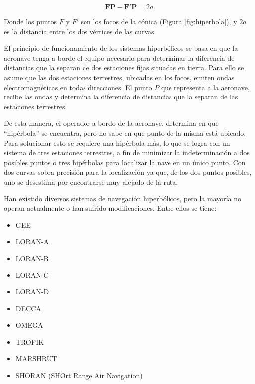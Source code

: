 \[\mathbf{FP}-\mathbf{F'P}= 2a
\]

Donde los puntos $F$ y $F'$ son los focos de la c\'onica (Figura \ref{fig:hiperbola}), y $2a$ es la distancia entre los dos v\'ertices de las curvas.

El principio de funcionamiento de los sistemas hiperb\'olicos se basa en que la aeronave tenga a borde el equipo necesario para determinar la diferencia de distancias que la separan de dos estaciones fijas situadas en tierra. Para ello se asume que las dos estaciones terrestres, ubicadas en los focos, emiten ondas electromagn\'eticas en todas direcciones. El punto $P$ que representa a la aeronave, recibe las ondas y determina la diferencia de distancias que la separan de las estaciones terrestres.

De esta manera, el operador a bordo de la aeronave, determina en que ``hip\'erbola'' se encuentra, pero no sabe en que punto de la misma est\'a ubicado. 
Para solucionar esto se requiere una hip\'erbola m\'as, lo que se logra
con un sistema de tres estaciones terrestres, 
a fin de minimizar la indeterminaci\'on a dos posibles puntos 
o tres hip\'erbolas para localizar la nave en un \'unico punto. 
Con dos curvas sobra precisi\'on para la localizaci\'on ya que, 
de los dos puntos posibles, uno se desestima por encontrarse muy alejado de la ruta.

Han existido diversos sistemas de navegaci\'on hiperb\'olicos, pero la mayor\'ia no operan actualmente o han sufrido modificaciones. Entre ellos se tiene:
\begin{multicols}{2}
\begin{itemize}
\item GEE

\item LORAN-A
\item  LORAN-B
\item LORAN-C
\item LORAN-D

\item DECCA

\item OMEGA

\item TROPIK

\item MARSHRUT

\item SHORAN (SHOrt Range Air Navigation)
\end{itemize}
\end{multicols}

